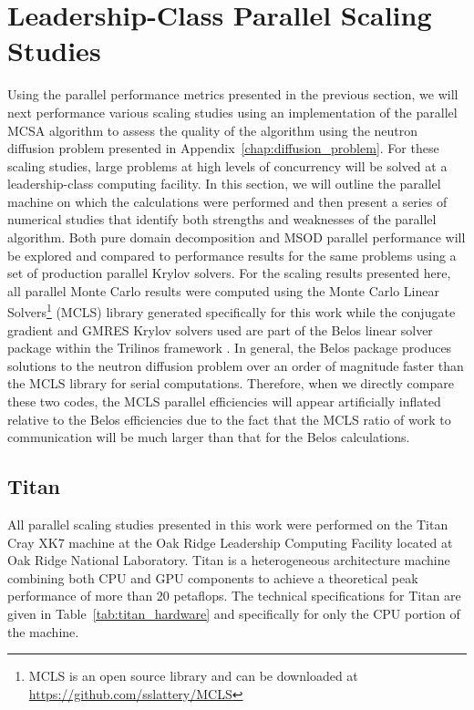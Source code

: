 \section{Leadership-Class Parallel Scaling Studies\ }
\label{sec:leadership_scaling_studies}
Using the parallel performance metrics presented in the previous
section, we will next performance various scaling studies using an
implementation of the parallel MCSA algorithm to assess the quality of
the algorithm using the neutron diffusion problem presented in
Appendix~\ref{chap:diffusion_problem}. For these scaling studies,
large problems at high levels of concurrency will be solved at a
leadership-class computing facility. In this section, we will outline
the parallel machine on which the calculations were performed and then
present a series of numerical studies that identify both strengths and
weaknesses of the parallel algorithm. Both pure domain decomposition
and MSOD parallel performance will be explored and compared to
performance results for the same problems using a set of production
parallel Krylov solvers. For the scaling results presented here, all
parallel Monte Carlo results were computed using the Monte Carlo
Linear Solvers\footnote{MCLS is an open source library and can be
  downloaded at \url{https://github.com/sslattery/MCLS}} (MCLS)
library generated specifically for this work while the conjugate
gradient and GMRES Krylov solvers used are part of the Belos linear
solver package within the Trilinos framework
\citep{heroux_overview_2005}. In general, the Belos package produces
solutions to the neutron diffusion problem over an order of magnitude
faster than the MCLS library for serial computations. Therefore, when
we directly compare these two codes, the MCLS parallel efficiencies
will appear artificially inflated relative to the Belos efficiencies
due to the fact that the MCLS ratio of work to communication will be
much larger than that for the Belos calculations.

\subsection{Titan }
\label{subsec:titan}
All parallel scaling studies presented in this work were performed on
the Titan Cray XK7 machine at the Oak Ridge Leadership Computing
Facility located at Oak Ridge National Laboratory. Titan is a
heterogeneous architecture machine combining both CPU and GPU
components to achieve a theoretical peak performance of more than 20
petaflops. The technical specifications for Titan are given in
Table~\ref{tab:titan_hardware} and specifically for only the CPU
portion of the machine.

